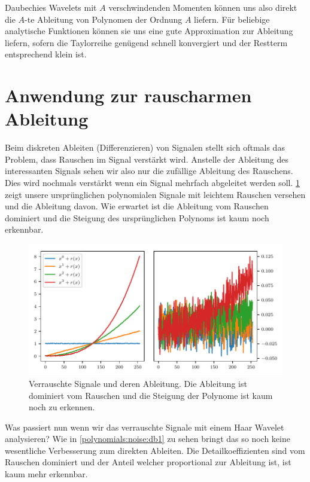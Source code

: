 \begin{refsection}
Daubechies Wavelets mit $A$ verschwindenden Momenten können uns also direkt die
$A$-te Ableitung von Polynomen der Ordnung $A$ liefern. Für beliebige
analytische Funktionen können sie uns eine gute Approximation zur Ableitung
liefern, sofern die Taylorreihe genügend schnell konvergiert und der Restterm
entsprechend klein ist.

\section{Anwendung zur rauscharmen Ableitung}

Beim diskreten Ableiten (Differenzieren) von Signalen stellt sich oftmals das
Problem, dass Rauschen im Signal verstärkt wird. Anstelle der Ableitung des
interessanten Signals sehen wir also nur die zufällige Ableitung des Rauschens.
Dies wird nochmals verstärkt wenn ein Signal mehrfach abgeleitet werden soll.
\cref{polynomials:noise:signals} zeigt unsere ursprünglichen polynomialen
Signale mit leichtem Rauschen versehen und die Ableitung davon. Wie erwartet
ist die Ableitung vom Rauschen dominiert und die Steigung des ursprünglichen
Polynoms ist kaum noch erkennbar.

\begin{figure}
    \centering
    \includegraphics{papers/polynomials/images/polynomials_noise_signals.pdf}
    \caption{Verrauschte Signale und deren Ableitung. Die Ableitung ist
             dominiert vom Rauschen und die Steigung der Polynome ist kaum noch
             zu erkennen.\label{polynomials:noise:signals}}
\end{figure}

Was passiert nun wenn wir das verrauschte Signale mit einem Haar Wavelet
analysieren?  Wie in \cref{polynomials:noise:db1} zu sehen bringt das so noch
keine wesentliche Verbesserung zum direkten Ableiten. Die Detailkoeffizienten
sind vom Rauschen dominiert und der Anteil welcher proportional zur Ableitung
ist, ist kaum mehr erkennbar.


\end{refsection}
